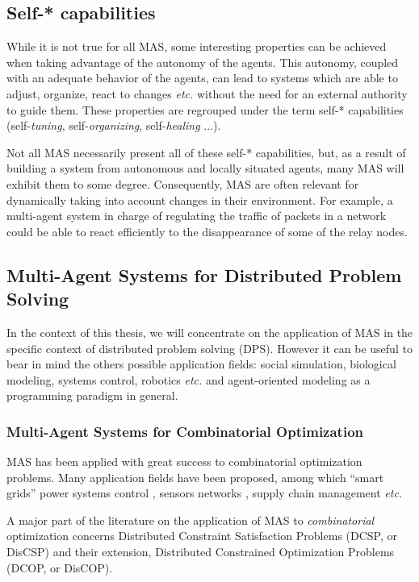 \subsection{Self-* capabilities}

While it is not true for all MAS, some interesting properties can be achieved when taking advantage of the autonomy of the agents. This autonomy, coupled with an adequate behavior of the agents, can lead to systems which are able to adjust, organize, react to changes \emph{etc.} without the need for an external authority to guide them. These properties are regrouped under the term self-* capabilities (self-\emph{tuning}, self-\emph{organizing}, self-\emph{healing} ...).

Not all MAS necessarily present all of these self-* capabilities, but, as a result of building a system from autonomous and locally situated agents, many MAS will exhibit them to some degree. Consequently, MAS are often relevant for dynamically taking into account changes in their environment. For example, a multi-agent system in charge of regulating the traffic of packets in a network could be able to react efficiently to the disappearance of some of the relay nodes.

\subsection{Multi-Agent Systems for Distributed Problem Solving}

In the context of this thesis, we will concentrate on the application of MAS in the specific context of distributed problem solving (DPS). However it can be useful to bear in mind the others possible application fields: social simulation, biological modeling, systems control, robotics \emph{etc.} and agent-oriented modeling as a programming paradigm in general.

\subsubsection{Multi-Agent Systems for Combinatorial Optimization}

MAS has been applied with great success to combinatorial optimization problems. Many application fields have been proposed, among which \enquote{smart grids} power systems control \cite{RocheLauriBlunierMiraouiKoukam2013_561}, sensors networks \cite{Vinyals3589}, supply chain management \cite{Marik2011, Ka2011.6} \emph{etc.}

A major part of the literature on the application of MAS to \emph{combinatorial} optimization concerns Distributed Constraint Satisfaction Problems (DCSP, or DisCSP) and their extension, Distributed Constrained Optimization Problems (DCOP, or DisCOP).


